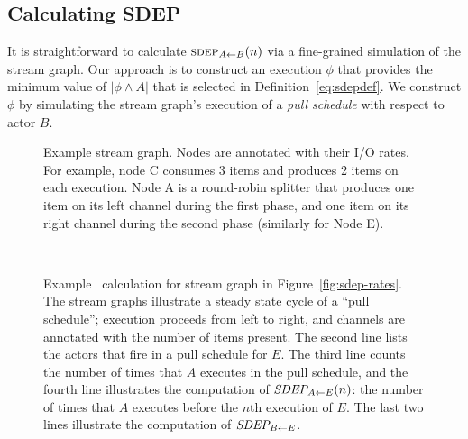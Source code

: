 \subsection*{Calculating SDEP}

It is straightforward to calculate $\textsc{sdep}_{A \small{\leftarrow} B}(n)$ via a
fine-grained simulation of the stream graph.  Our approach is to
construct an execution $\phi$ that provides the minimum value of
$|\phi \wedge A|$ that is selected in Definition~\ref{eq:sdepdef}.  We
construct $\phi$ by simulating the stream graph's execution of a {\it
pull schedule} with respect to actor $B$.

\begin{figure}[t!]
\begin{center}
\vspace{-12pt}
\vspace{-6pt}
\caption[Example stream graph for calculation of stream dependence
  function.]{Example stream graph.  Nodes are annotated with their I/O
  rates.  For example, node C consumes 3 items and produces 2 items on
  each execution.  Node A is a round-robin splitter that produces one
  item on its left channel during the first phase, and one item on its
  right channel during the second phase (similarly for Node E).
  \protect\label{fig:sdep-rates}}

~ \\ \vspace{6pt}
\vspace{-4pt}
\caption[Example calculation of stream dependence function.]{Example \figsdep\ calculation
  for stream graph in Figure~\ref{fig:sdep-rates}.  The stream graphs
  illustrate a steady state cycle of a ``pull schedule''; execution
  proceeds from left to right, and channels are annotated with the
  number of items present.  The second line lists the actors that fire
  in a pull schedule for $E$.  The third line counts the number of
  times that $A$ executes in the pull schedule, and the fourth line
  illustrates the computation of $\mbox{\it SDEP}_{A \small{\leftarrow} E}(n)$: the number of
  times that $A$ executes before the $n$th execution of $E$.  The last
  two lines illustrate the computation of $\mbox{\it SDEP}_{B \small{\leftarrow} E}$.
  \protect\label{fig:sdep1}}
\end{center}
\vspace{-26pt}
\end{figure}

